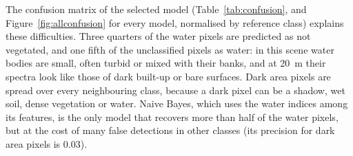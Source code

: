 \documentclass[11pt,a4paper]{article}
\begin{document}
\begin{table}[H]
\centering\small
\caption{Recall per class on the test set (of the pixels of a class, the share
the model recovers). The best value of each class is in bold.}
\label{tab:recall}

\end{table}

The confusion matrix of the selected model (Table~\ref{tab:confusion}, and
Figure~\ref{fig:allconfusion} for every model, normalised by reference class)
explains these difficulties. Three quarters of the
water pixels are predicted as not vegetated, and one fifth of the unclassified
pixels as water: in this scene water bodies are small, often turbid or mixed
with their banks, and at 20~m their spectra look like those of dark built-up
or bare surfaces. Dark area pixels are spread over every neighbouring class,
because a dark pixel can be a shadow, wet soil, dense vegetation or water.
Naive Bayes, which uses the water indices among its features, is the only
model that recovers more than half of the water pixels, but at the cost of
many false detections in other classes (its precision for dark area pixels is
0.03).

\begin{table}[H]
\centering\small
\caption{Confusion matrix of the Support Vector Machine on the test set
(pixels; reference classes in rows, predicted classes in columns). Class 10
has no test pixels.}
\label{tab:confusion}

\end{table}
\end{document}
